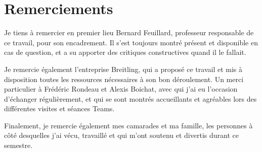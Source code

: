 \chapter{Remerciements}

Je tiens à remercier en premier lieu Bernard Feuillard, professeur
responsable de ce travail, pour son encadrement. Il s'est toujours montré
présent et disponible en cas de question, et a su apporter des critiques
constructives quand il le fallait.

Je remercie également l'entreprise Breitling, qui a proposé ce travail et
mis à disposition toutes les ressources nécessaires à son bon déroulement.
Un merci particulier à Frédéric Rondeau et Alexis Boichat, avec qui j'ai eu
l'occasion d'échanger régulièrement, et qui se sont montrés accueillants et
agréables lors des différentes visites et séances Teams.

Finalement, je remercie également mes camarades et ma famille, les personnes à côté
desquelles j'ai vécu, travaillé et qui m'ont soutenu
et divertis durant ce semestre.
